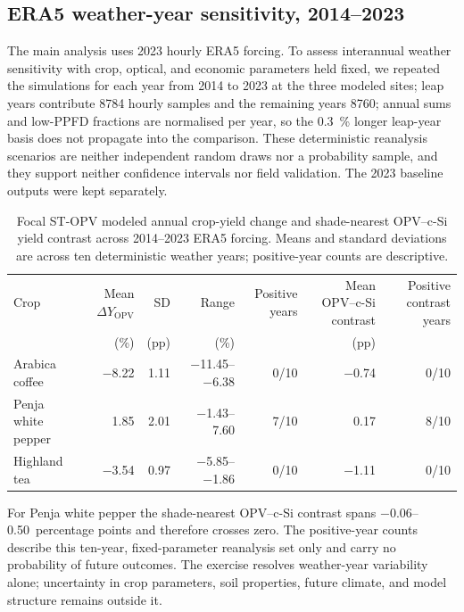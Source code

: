 \documentclass[preprint,12pt,a4paper]{elsarticle}
\begin{document}
\subsection{ERA5 weather-year sensitivity, 2014--2023}
\label{sec:sm_weather_decade}

The main analysis uses 2023 hourly ERA5 forcing. To assess interannual weather sensitivity with crop, optical, and economic parameters held fixed, we repeated the simulations for each year from 2014 to 2023 at the three modeled sites; leap years contribute 8784 hourly samples and the remaining years 8760; annual sums and low-PPFD fractions are normalised per year, so the \qty{0.3}{\percent} longer leap-year basis does not propagate into the comparison. These deterministic reanalysis scenarios are neither independent random draws nor a probability sample, and they support neither confidence intervals nor field validation. The 2023 baseline outputs were kept separately.

\begin{table}[htbp]
 \centering
 \scriptsize
 \caption{Focal ST-OPV modeled annual crop-yield change and shade-nearest OPV--c-Si yield contrast across 2014--2023 ERA5 forcing. Means and standard deviations are across ten deterministic weather years; positive-year counts are descriptive.}
 \label{tab:weather_decade}
 \begin{tabular}{@{}lrrrrrr@{}}
 \toprule
 Crop & Mean $\Delta Y_{\mathrm{OPV}}$ & SD & Range & Positive years & Mean OPV--c-Si contrast & Positive contrast years \\
 & (\unit{\percent}) & (\unit{pp}) & (\unit{\percent}) & & (\unit{pp}) & \\
 \midrule
 Arabica coffee & \num{-8.22} & \num{1.11} & \numrange{-11.45}{-6.38} & 0/10 & \num{-0.74} & 0/10 \\
 Penja white pepper & \num{+1.85} & \num{2.01} & \numrange{-1.43}{+7.60} & 7/10 & \num{+0.17} & 8/10 \\
 Highland tea & \num{-3.54} & \num{0.97} & \numrange{-5.85}{-1.86} & 0/10 & \num{-1.11} & 0/10 \\
 \bottomrule
 \end{tabular}
\end{table}

For Penja white pepper the shade-nearest OPV--c-Si contrast spans \numrange{-0.06}{+0.50}~percentage points and therefore crosses zero. The positive-year counts describe this ten-year, fixed-parameter reanalysis set only and carry no probability of future outcomes. The exercise resolves weather-year variability alone; uncertainty in crop parameters, soil properties, future climate, and model structure remains outside it.
\end{document}
